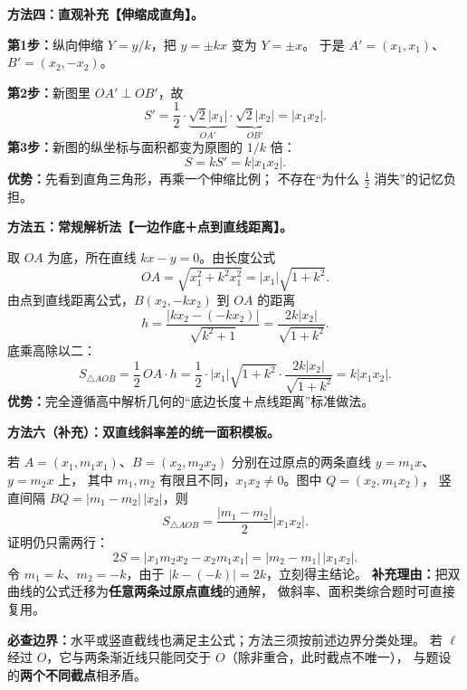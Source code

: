 \clearpage
\begin{proofbox}
\textbf{方法四：直观补充【伸缩成直角】。}
\begin{center}\end{center}


\textbf{第1步：}纵向伸缩 $Y=y/k$，把 $y=\pm kx$ 变为 $Y=\pm x$。
于是 $A'=(x_1,x_1)$、$B'=(x_2,-x_2)$。

\textbf{第2步：}新图里 $OA'\perp OB'$，故
\[
S'=\frac12\cdot\underbrace{\sqrt2|x_1|}_{OA'}
\cdot\underbrace{\sqrt2|x_2|}_{OB'}=|x_1x_2|.
\]
\textbf{第3步：}新图的纵坐标与面积都变为原图的 $1/k$ 倍：
\[
S=kS'=\boxed{k|x_1x_2|}.
\]
\textbf{优势：}先看到直角三角形，再乘一个伸缩比例；
不存在“为什么 $\tfrac12$ 消失”的记忆负担。

\medskip
\end{proofbox}
\clearpage
\begin{proofbox}
\textbf{方法五：常规解析法【一边作底＋点到直线距离】。}
\begin{center}\end{center}


取 $OA$ 为底，所在直线 $kx-y=0$。由长度公式
\[
OA=\sqrt{x_1^2+k^2x_1^2}=|x_1|\sqrt{1+k^2}.
\]
由点到直线距离公式，$B(x_2,-kx_2)$ 到 $OA$ 的距离
\[
h=\frac{|kx_2-(-kx_2)|}{\sqrt{k^2+1}}
=\frac{2k|x_2|}{\sqrt{1+k^2}}.
\]
底乘高除以二：
\[
S_{\triangle AOB}=\frac12\,OA\cdot h
=\frac12\cdot|x_1|\sqrt{1+k^2}
\cdot\frac{2k|x_2|}{\sqrt{1+k^2}}
=\boxed{k|x_1x_2|}.
\]
\textbf{优势：}完全遵循高中解析几何的“底边长度＋点线距离”标准做法。

\medskip
\end{proofbox}
\clearpage
\begin{proofbox}
\textbf{方法六（补充）：双直线斜率差的统一面积模板。}
\begin{center}\end{center}


若 $A=(x_1,m_1x_1)$、$B=(x_2,m_2x_2)$
分别在过原点的两条直线 $y=m_1x$、$y=m_2x$ 上，
其中 $m_1,m_2$ 有限且不同，$x_1x_2\ne0$。图中 $Q=(x_2,m_1x_2)$，
竖直间隔 $BQ=|m_1-m_2|\,|x_2|$，则
\[
\boxed{S_{\triangle AOB}=\frac{|m_1-m_2|}{2}|x_1x_2|}.
\]
证明仍只需两行：
\[
2S=|x_1m_2x_2-x_2m_1x_1|
=|m_2-m_1|\,|x_1x_2|.
\]
令 $m_1=k$、$m_2=-k$，由于 $|k-(-k)|=2k$，立刻得主结论。
\textbf{补充理由：}把双曲线的公式迁移为\textbf{任意两条过原点直线}的通解，
做斜率、面积类综合题时可直接复用。

\medskip
\textbf{必查边界：}水平或竖直截线也满足主公式；方法三须按前述边界分类处理。
若 $\ell$ 经过 $O$，它与两条渐近线只能同交于 $O$（除非重合，此时截点不唯一），
与题设的\textbf{两个不同截点}相矛盾。
\end{proofbox}
